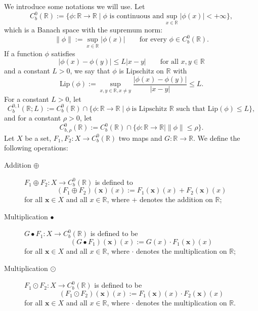 \documentclass[11pt,reqno,a4paper]{amsart}
\numberwithin{equation}{section}
\begin{document}
We introduce some notations we will use.  
Let $$C_{b}^{0}(\mathbb{R}):= \{ \phi: \mathbb{R} \to \mathbb{R} \mid \phi  \text{ is continuous and} \sup _{x \in \mathbb{R}}|\phi(x)| < +\infty \}, $$
which is a Banach space with the supremum norm:
\[ \|\phi\|:=\sup_{x\in\mathbb{R}} |\phi(x)| \qquad \text{for every } \phi \in C_{b}^{0}(\mathbb{R}).\]
If a function $\phi$ satisfies 
\[ |\phi(x)-\phi(y)|\le L|x-y| \qquad \text{for all } x,y\in\mathbb R\]
and a constant $L>0$, we say that $\phi$ is Lipschitz on $\mathbb{R}$ with 
\[ \text{Lip}(\phi) := \sup_{x,y\in \mathbb R, x\ne y} \frac{|\phi(x)-\phi(y)|}{|x-y|} \le L.\]
For a constant $L > 0 $, let
\begin{equation*}
C_{b}^{0,1}(\mathbb{R};L) := C_{b}^{0}(\mathbb{R}) \cap \{ \phi: \mathbb{R} \to \mathbb{R} \mid \phi ~\text{is Lipschitz $\mathbb{R}$   such that } \text{Lip}(\phi) \le L \},
\end{equation*}
and for a constant $ \rho > 0 $, let
$$ C_{b,\rho}^0(\mathbb{R}) := C_{b}^{0}(\mathbb{R}) \cap \{ \phi: \mathbb{R} \to \mathbb{R} \mid \|\phi\| \le \rho \}.$$
Let $X$ be a set, $F_1, F_2 : X \to C_{b}^{0}(\mathbb{R})$ two maps and $G:\mathbb R\to \mathbb R$. We define the following operations:
\begin{description}
     \item[ Addition $\oplus$] $F_1\oplus F_2 : X \to C_{b}^{0}(\mathbb{R})$ is defined to 
    \[(F_1\oplus F_2)(\mathbf{x})(x):=F_1(\mathbf{x})(x)+F_2(\mathbf{x})(x)\]
    for all $\mathbf{x}\in X$ and all $x\in\mathbb R$, where $+$ denotes the addition on $\mathbb{R}$;
    \item[Multiplication $\bullet$] $G \bullet F_1: X\to C_{b}^{0}(\mathbb{R})$ is defined to be 
    \[(G\bullet F_1 )(\mathbf{x})(x):= G(x) \cdot F_1(\mathbf{x})(x)\] for all $\mathbf{x}\in X$ and all $x\in\mathbb R$, where $\cdot$ denotes the multiplication on $\mathbb{R}$;
    \item[Multiplication $\odot$] $F_1 \odot F_2 : X \to C_{b}^{0}(\mathbb{R})$ is defined to be 
    \[(F_1 \odot F_2)(\mathbf{x})(x):= F_1(\mathbf{x})(x) \cdot F_2(\mathbf{x})(x)\]
    for all $\mathbf{x}\in X$ and all $x\in\mathbb R$, where $\cdot$ denotes the multiplication on $\mathbb{R}$.
\end{description}
\end{document}
